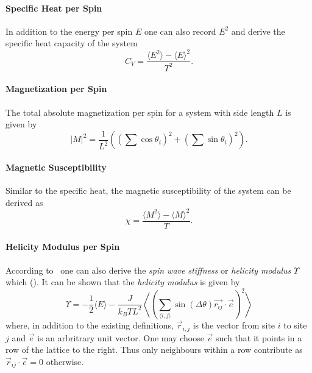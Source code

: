 		\paragraph{Specific Heat per Spin}
			In addition to the energy per spin $E$ one can also record $E^2$ and derive the specific heat capacity of the system
			\begin{equation}\label{eq:specific_heat}
				C_V = \frac{\langle E^2 \rangle - \langle E \rangle^2}{T^2}.
			\end{equation}
		
		\paragraph{Magnetization per Spin}
			The total absolute magnetization per spin for a system with side length $L$ is given by
			\begin{equation}\label{eq:magnetization}
				\lvert M \rvert^2 = \frac{1}{L^2} \left( (\sum{\cos\theta_i})^2 + (\sum{\sin\theta_i})^2 \right).
			\end{equation}
		
		\paragraph{Magnetic Susceptibility}
			Similar to the specific heat, the magnetic susceptibility of the system can be derived as
			\begin{equation}\label{eq:magnetic_suceptibility}
				\chi = \frac{\langle M^2 \rangle - \langle M \rangle^2}{T}.
			\end{equation}
		
		\paragraph{Helicity Modulus per Spin}
			According to~\cite{teitel_helicity} one can also derive the \emph{spin wave stiffness} or \emph{helicity modulus} $\Upsilon$ which  (\cite{teitel_helicity}). It can be shown that the \emph{helicity modulus} is given by
			\begin{equation}\label{eq:helicity_modulus}
				\Upsilon = -\frac{1}{2} \langle E \rangle - \frac{J}{k_B T L^2} \left\langle \left(\sum_{\langle i,j \rangle}{\sin(\Delta \theta) \vec{r_{ij}} \cdot \vec{e}}\right)^2 \right\rangle
			\end{equation}
			\cite[eq. 3.2]{teitel_helicity} where, in addition to the existing definitions, $\vec{r}_{i,j}$ is the vector from site $i$ to site $j$ and $\vec{e}$ is an arbritrary unit vector. One may choose $\vec{e}$ such that it points in a row of the lattice to the right. Thus only neighbours within a row contribute as $\vec{r}_{ij} \cdot \vec{e} = 0$ otherwise.
	
